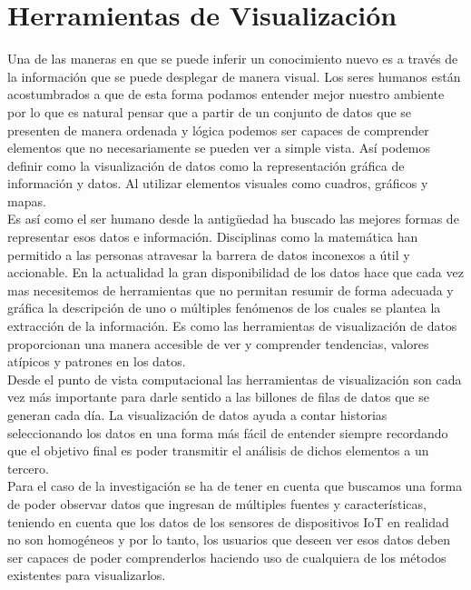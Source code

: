 \section{Herramientas de Visualización}
Una de las maneras en que se puede inferir un conocimiento nuevo es a través de la información que se puede desplegar de manera visual. Los seres humanos están acostumbrados a que de esta forma podamos entender mejor nuestro ambiente por lo que es natural pensar que a partir de un conjunto de datos que se presenten de manera ordenada y lógica podemos ser capaces de comprender elementos que no necesariamente se pueden ver a simple vista. Así podemos definir como la visualización de datos como la  representación gráfica de información y datos. Al utilizar elementos visuales como cuadros, gráficos y mapas\cite{visualizaciondef}.\\

Es así como el ser humano desde la antigüedad ha buscado las mejores formas de representar esos datos e información. Disciplinas como la matemática han permitido a las personas atravesar la barrera de datos inconexos a  útil y accionable. En la actualidad la gran disponibilidad de los datos hace que cada vez mas necesitemos de herramientas que no permitan resumir de forma adecuada y gráfica la descripción de uno o múltiples fenómenos de los cuales se plantea la extracción de la información. Es como las herramientas de visualización de datos proporcionan una manera accesible de ver y comprender tendencias, valores atípicos y patrones en los datos.\\

Desde el punto de vista computacional las herramientas de visualización son cada vez más importante para darle sentido a las billones de filas de datos que se generan cada día. La visualización de datos ayuda a contar historias seleccionando los datos en una forma más fácil de entender\cite{visualizaciondef} siempre recordando que el objetivo final es poder transmitir el análisis de dichos elementos a un tercero.\\

Para el caso de la investigación se ha de tener en cuenta que buscamos una forma de poder observar datos que ingresan de múltiples fuentes y características, teniendo en cuenta que los datos de los sensores de dispositivos IoT en realidad no son homogéneos y por lo tanto, los usuarios que deseen ver esos datos deben ser capaces de poder comprenderlos haciendo uso de cualquiera de los métodos existentes para visualizarlos. 

